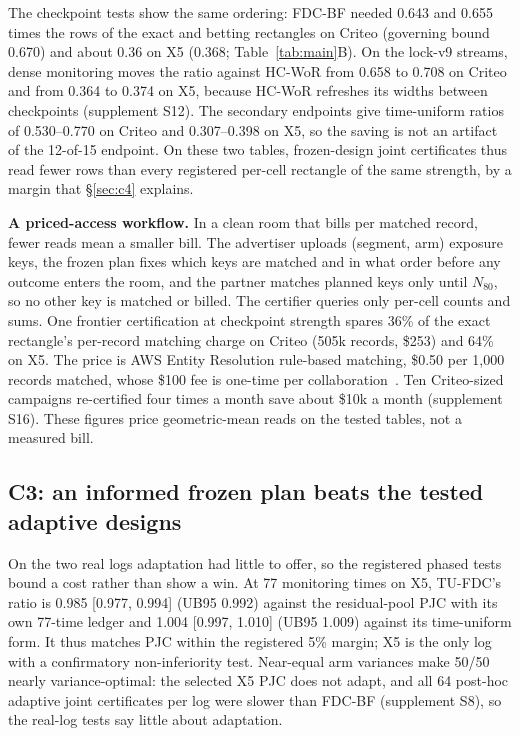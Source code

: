 \documentclass[sigconf,anonymous,review]{acmart}
\begin{document}
The checkpoint tests show the same ordering: FDC-BF needed 0.643 and 0.655 times the rows of the exact and betting rectangles on Criteo (governing bound 0.670) and about 0.36 on X5 (0.368; Table~\ref{tab:main}B). On the lock-v9 streams, dense monitoring moves the ratio against HC-WoR from 0.658 to 0.708 on Criteo and from 0.364 to 0.374 on X5, because HC-WoR refreshes its widths between checkpoints (supplement S12). The secondary endpoints give time-uniform ratios of 0.530--0.770 on Criteo and 0.307--0.398 on X5, so the saving is not an artifact of the 12-of-15 endpoint. On these two tables, frozen-design joint certificates thus read fewer rows than every registered per-cell rectangle of the same strength, by a margin that \S\ref{sec:c4} explains.

\textbf{A priced-access workflow.} In a clean room that bills per matched record, fewer reads mean a smaller bill. The advertiser uploads (segment, arm) exposure keys, the frozen plan fixes which keys are matched and in what order before any outcome enters the room, and the partner matches planned keys only until $N_{80}$, so no other key is matched or billed. The certifier queries only per-cell counts and sums. One frontier certification at checkpoint strength spares 36\% of the exact rectangle's per-record matching charge on Criteo (505k records, \$253) and 64\% on X5. The price is AWS Entity Resolution rule-based matching, \$0.50 per 1,000 records matched, whose \$100 fee is one-time per collaboration~\citep{awscleanrooms2026pricing}. Ten Criteo-sized campaigns re-certified four times a month save about \$10k a month (supplement S16). These figures price geometric-mean reads on the tested tables, not a measured bill.

\subsection{C3: an informed frozen plan beats the tested adaptive designs}\label{sec:c3}

On the two real logs adaptation had little to offer, so the registered phased tests bound a cost rather than show a win. At 77 monitoring times on X5, TU-FDC's ratio is 0.985 [0.977, 0.994] (UB95 0.992) against the residual-pool PJC with its own 77-time ledger and 1.004 [0.997, 1.010] (UB95 1.009) against its time-uniform form. It thus matches PJC within the registered 5\% margin; X5 is the only log with a confirmatory non-inferiority test. Near-equal arm variances make 50/50 nearly variance-optimal: the selected X5 PJC does not adapt, and all 64 post-hoc adaptive joint certificates per log were slower than FDC-BF (supplement S8), so the real-log tests say little about adaptation.
\end{document}
